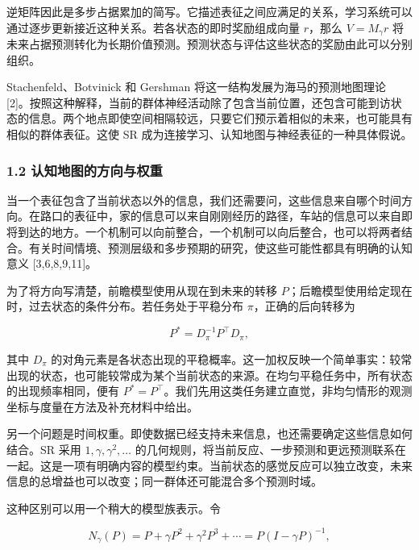 \documentclass[11pt,a4paper]{article}
\begin{document}
逆矩阵因此是多步占据累加的简写。它描述表征之间应满足的关系，学习系统可以通过逐步更新接近这种关系。若各状态的即时奖励组成向量
\(r\)，那么 \(V=M_\gamma r\)
将未来占据预测转化为长期价值预测。预测状态与评估这些状态的奖励由此可以分别组织。

Stachenfeld、Botvinick 和 Gershman 将这一结构发展为海马的预测地图理论
{[}2{]}。按照这种解释，当前的群体神经活动除了包含当前位置，还包含可能到访状态的信息。两个地点即使空间相隔较远，只要它们预示着相似的未来，也可能具有相似的群体表征。这使
SR 成为连接学习、认知地图与神经表征的一种具体假说。

\subsubsection{1.2
认知地图的方向与权重}\label{ux8ba4ux77e5ux5730ux56feux7684ux65b9ux5411ux4e0eux6743ux91cd}

当一个表征包含了当前状态以外的信息，我们还需要问，这些信息来自哪个时间方向。在路口的表征中，家的信息可以来自刚刚经历的路径，车站的信息可以来自即将到达的地方。一个机制可以向前整合，一个机制可以向后整合，也可以将两者结合。有关时间情境、预测层级和多步预期的研究，使这些可能性都具有明确的认知意义
{[}3,6,8,9,11{]}。

\par
\noindent\begin{minipage}{\linewidth}

为了将方向写清楚，前瞻模型使用从现在到未来的转移
\(P\)；后瞻模型使用给定现在时，过去状态的条件分布。若任务处于平稳分布
\(\pi\)，正确的后向转移为

\[
P^*=D_\pi^{-1}P^\top D_\pi,
\]

\end{minipage}\par

其中 \(D_\pi\)
的对角元素是各状态出现的平稳概率。这一加权反映一个简单事实：较常出现的状态，也可能较常成为某个当前状态的来源。在均匀平稳任务中，所有状态的出现频率相同，便有
\(P^*=P^\top\)。我们先用这类任务建立直觉，非均匀情形的观测坐标与度量在方法及补充材料中给出。

另一个问题是时间权重。即使数据已经支持未来信息，也还需要确定这些信息如何结合。SR
采用 \(1,\gamma,\gamma^2,\ldots\)
的几何规则，将当前反应、一步预测和更远预测联系在一起。这是一项有明确内容的模型约束。当前状态的感觉反应可以独立改变，未来信息的总增益也可以改变；同一群体还可能混合多个预测时域。

\par
\noindent\begin{minipage}{\linewidth}

这种区别可以用一个稍大的模型族表示。令

\[
N_\gamma(P)=P+\gamma P^2+\gamma^2P^3+\cdots
=P(I-\gamma P)^{-1},
\]

\end{minipage}\par
\end{document}
